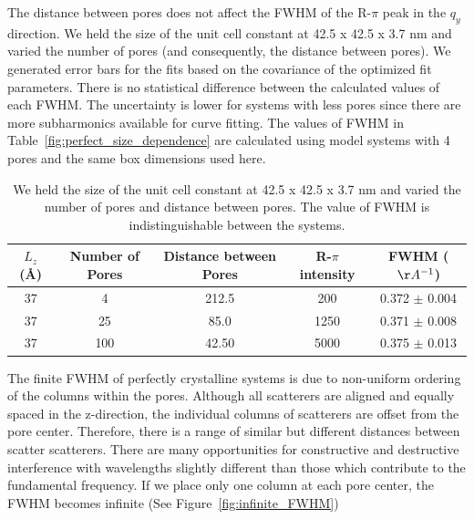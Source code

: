 \documentclass{article}
\begin{document}
  The distance between pores does not affect the FWHM of the R-$\pi$ peak in
  the $q_y$ direction.  We held the size of the unit cell constant at 42.5 x 42.5
  x 3.7 nm and varied the number of pores (and consequently, the distance between
  pores). We generated error bars for the fits based on the covariance of the
  optimized fit parameters. There is no statistical difference between the
  calculated values of each FWHM. The uncertainty is lower for systems with less
  pores since there are more subharmonics available for curve fitting. The values
  of FWHM in Table~\ref{fig:perfect_size_dependence} are calculated using model
  systems with 4 pores and the same box dimensions used here. 

  \begin{table}[!htb]
  \centering
  \begin{tabular}{c c c c c}
  \toprule
  $L_z$ (\AA) & Number of Pores & Distance between Pores &  R-$\pi$ intensity & FWHM ($\AA^{-1}$) \\
  \midrule
  37          &      4            & 212.5                & 200                & 0.372 $\pm$ 0.004 \\ 
  37          &      25           & 85.0                 & 1250               & 0.371 $\pm$ 0.008 \\
  37          &      100          & 42.50                & 5000               & 0.375 $\pm$ 0.013 \\
  \bottomrule
  \end{tabular}
  \caption{We held the size of the unit cell constant at 42.5 x 42.5 x 3.7 nm and varied the
   number of pores and distance between pores. The value of FWHM is indistinguishable between
   the systems.}\label{table:randomly_displaced_columns}
  \end{table}

  The finite FWHM of perfectly crystalline systems is due to non-uniform
  ordering of the columns within the pores. Although all scatterers are aligned
  and equally spaced in the z-direction, the individual columns of scatterers are
  offset from the pore center. Therefore, there is a range of similar but
  different distances between scatter scatterers. There are many opportunities
  for constructive and destructive interference with wavelengths slightly
  different than those which contribute to the fundamental frequency. If we place
  only one column at each pore center, the FWHM becomes infinite (See
  Figure~\ref{fig:infinite_FWHM})
\end{document}
